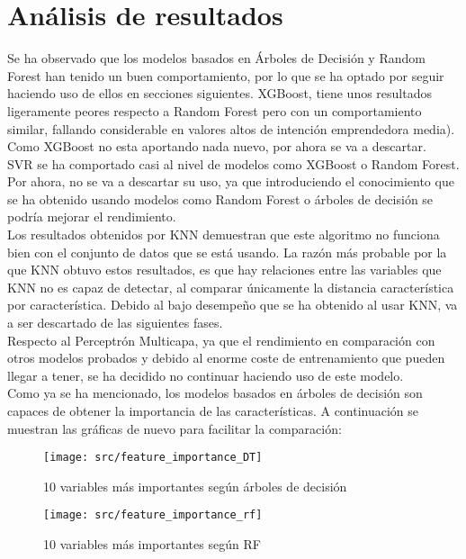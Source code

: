 \section{Análisis de resultados}
Se ha observado que los modelos basados en Árboles de Decisión y Random Forest han tenido un buen comportamiento, por lo que se ha optado por seguir haciendo uso de ellos en secciones siguientes. XGBoost, tiene unos resultados ligeramente peores respecto a Random Forest pero con un comportamiento similar, fallando considerable en valores altos de intención emprendedora media). Como XGBoost no esta aportando nada nuevo, por ahora se va a descartar.\\
\linebreak
SVR se ha comportado casi al nivel de modelos como XGBoost o Random Forest. Por ahora, no se va a descartar su uso, ya que introduciendo el conocimiento que se ha obtenido usando modelos como Random Forest o árboles de decisión se podría mejorar el rendimiento.\\
\linebreak
Los resultados obtenidos por  KNN demuestran que este algoritmo no funciona bien con el conjunto de datos que se está usando. La razón más probable por la que KNN obtuvo estos resultados, es que hay relaciones entre las variables que KNN no es capaz de detectar, al comparar únicamente la distancia característica por característica. Debido al bajo desempeño que se ha obtenido al usar KNN, va a ser descartado de las siguientes fases.\\
\linebreak
Respecto al Perceptrón Multicapa, ya que el rendimiento en comparación con otros modelos probados y debido al enorme coste de entrenamiento que pueden llegar a tener, se ha decidido no continuar haciendo uso de este modelo.\\
\linebreak
Como ya se ha mencionado, los modelos basados en árboles de decisión son capaces de obtener la importancia de las características. A continuación se muestran las gráficas de nuevo para facilitar la comparación:
\begin{figure}[H]
	\centering
	\texttt{[image: src/feature\_importance\_DT]}
	\caption{10 variables más importantes según árboles de decisión}
	\label{fig:feature_dtree2}
\end{figure}
\begin{figure}[H]
	\centering
	\texttt{[image: src/feature\_importance\_rf]}
	\caption{10 variables más importantes según RF}
	\label{fig:feature_rf2}
\end{figure}
